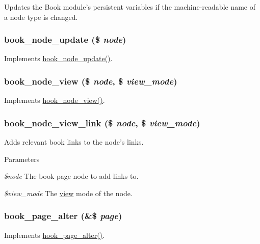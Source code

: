 Updates the Book module's persistent variables if the machine-\/readable name of a node type is changed. \hypertarget{book_8module_a2584e02b999649d42f6b8ad5204348e8}{
\subsubsection[{book\_\-node\_\-update}]{\setlength{\rightskip}{0pt plus 5cm}book\_\-node\_\-update (\$ {\em node})}}
\label{book_8module_a2584e02b999649d42f6b8ad5204348e8}
Implements \hyperlink{group__node__api__hooks_gac66c767cc922fcbfdaf17252e5d87d9d}{hook\_\-node\_\-update()}. \hypertarget{book_8module_ada015b07f80e70b3ce4b13b2de4a63ec}{
\subsubsection[{book\_\-node\_\-view}]{\setlength{\rightskip}{0pt plus 5cm}book\_\-node\_\-view (\$ {\em node}, \/  \$ {\em view\_\-mode})}}
\label{book_8module_ada015b07f80e70b3ce4b13b2de4a63ec}
Implements \hyperlink{group__node__api__hooks_ga475290ee8e81a2373ea17c512cc3f9a9}{hook\_\-node\_\-view()}. \hypertarget{book_8module_ae26105281c84829027a9e23ac5b501f5}{
\subsubsection[{book\_\-node\_\-view\_\-link}]{\setlength{\rightskip}{0pt plus 5cm}book\_\-node\_\-view\_\-link (\$ {\em node}, \/  \$ {\em view\_\-mode})}}
\label{book_8module_ae26105281c84829027a9e23ac5b501f5}
Adds relevant book links to the node's links.


\begin{DoxyParams}{Parameters}
\item[{\em \$node}]The book page node to add links to. \item[{\em \$view\_\-mode}]The \hyperlink{classview}{view} mode of the node. \end{DoxyParams}
\hypertarget{book_8module_a0c371bf864f09eaa2090aa92a610c090}{
\subsubsection[{book\_\-page\_\-alter}]{\setlength{\rightskip}{0pt plus 5cm}book\_\-page\_\-alter (\&\$ {\em page})}}
\label{book_8module_a0c371bf864f09eaa2090aa92a610c090}
Implements \hyperlink{group__hooks_gaa965aa8f38b48aed1a19c556c199145f}{hook\_\-page\_\-alter()}.

